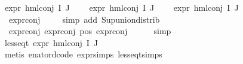 \begin{isabellebody}
\ {\isachardoublequoteopen}expr{\isacharunderscore}{\kern0pt}{}\ {\isacharparenleft}{\kern0pt}hml{\isacharunderscore}{\kern0pt}conj\ I\ J\ {\isasymPhi}{\isacharparenright}{\kern0pt}\ {\isasymle}\ {}{\isachardoublequoteclose}\isanewline
{}\ {\isachardoublequoteopen}expr{\isacharunderscore}{\kern0pt}{}\ {\isacharparenleft}{\kern0pt}hml{\isacharunderscore}{\kern0pt}conj\ I\ J\ {\isasymPhi}{\isacharparenright}{\kern0pt}\ {\isasymle}\ {}{\isachardoublequoteclose}\isanewline
{}\ {\isachardoublequoteopen}expr{\isacharunderscore}{\kern0pt}{}\ {\isacharparenleft}{\kern0pt}hml{\isacharunderscore}{\kern0pt}conj\ I\ J\ {\isasymPhi}{\isacharparenright}{\kern0pt}\ {\isasymle}\ {}{\isachardoublequoteclose}\isanewline
\ \ \ \ \isamarkupfalse%
\ {}\ expr{\isacharunderscore}{\kern0pt}{}{\isacharunderscore}{\kern0pt}conj\ \isamarkupfalse%
\ {}\ \isamarkupfalse%
\ {\isacharparenleft}{\kern0pt}simp\ add{\isacharcolon}{\kern0pt}\ Sup{\isacharunderscore}{\kern0pt}union{\isacharunderscore}{\kern0pt}distrib{\isacharparenright}{\kern0pt}\isanewline
\ \ \ \ \isamarkupfalse%
\ {}\ expr{\isacharunderscore}{\kern0pt}{}{\isacharunderscore}{\kern0pt}conj\ expr{\isacharunderscore}{\kern0pt}{}{\isacharunderscore}{\kern0pt}conj\ pos\ expr{\isacharunderscore}{\kern0pt}{}{\isacharunderscore}{\kern0pt}conj\isanewline
\ \ \ \ \isamarkupfalse%
\ simp{\isacharplus}{\kern0pt}\isanewline
\ \ \isamarkupfalse%
\ {\isachardoublequoteopen}less{\isacharunderscore}{\kern0pt}eq{\isacharunderscore}{\kern0pt}t\ {\isacharparenleft}{\kern0pt}expr\ {\isacharparenleft}{\kern0pt}hml{\isacharunderscore}{\kern0pt}conj\ I\ J\ {\isasymPhi}{\isacharparenright}{\kern0pt}{\isacharparenright}{\kern0pt}\ {\isacharparenleft}{\kern0pt}{}{\isacharcomma}{\kern0pt}\ {\isasyminfinity}{\isacharcomma}{\kern0pt}\ {}{\isacharcomma}{\kern0pt}\ {}{\isacharcomma}{\kern0pt}\ {}{\isacharcomma}{\kern0pt}\ {}{\isacharparenright}{\kern0pt}{\isachardoublequoteclose}\isanewline
\ \ \ \ \isamarkupfalse%
\ {\isacharparenleft}{\kern0pt}metis\ enat{\isacharunderscore}{\kern0pt}ord{\isacharunderscore}{\kern0pt}code{\isacharparenleft}{\kern0pt}{}{\isacharparenright}{\kern0pt}\ expr{\isachardot}{\kern0pt}simps\ less{\isacharunderscore}{\kern0pt}eq{\isacharunderscore}{\kern0pt}t{\isachardot}{\kern0pt}simps{\isacharparenright}{\kern0pt}\isanewline

\end{isabellebody}
